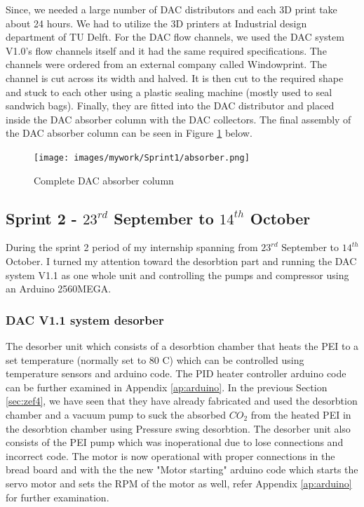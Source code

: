 Since, we needed a large number of DAC distributors and each 3D print take about 24 hours. We had to utilize the 3D printers at Industrial design department of TU Delft. For the DAC flow channels, we used the DAC system V1.0's flow channels itself and it had the same required specifications. The channels were ordered from an external company called Windowprint. The channel is cut across its width and halved. It is then cut to the required shape and stuck to each other using a plastic sealing machine (mostly used to seal sandwich bags). Finally, they are fitted into the DAC distributor and placed inside the DAC absorber column with the DAC collectors. The final assembly of the DAC absorber column can be seen in Figure \ref{fig:absorber} below.  

\begin{figure}[H]
    \centering
    \texttt{[image: images/mywork/Sprint1/absorber.png]}
    \caption{Complete DAC absorber column}
    \label{fig:absorber}
\end{figure}

\subsection{Sprint 2 - $23^{rd}$ September to $14^{th}$ October}
\label{sec:sprint2}

During the sprint 2 period of my internship spanning from $23^{rd}$ September to $14^{th}$ October. I turned my attention toward the desorbtion part and running the DAC system V1.1 as one whole unit and controlling the pumps and compressor using an Arduino 2560MEGA.  

\subsubsection{DAC V1.1 system desorber}
\label{sec:faultycomp}

The desorber unit which consists of a desorbtion chamber that heats the PEI to a set temperature (normally set to 80 \degree C) which can be controlled using temperature sensors and arduino code. The PID heater controller arduino code can be further examined in Appendix \ref{ap:arduino}. In the previous Section \ref{sec:zef4}, we have seen that they have already fabricated and used the desorbtion chamber and a vacuum pump to suck the absorbed $CO_2$ from the heated PEI in the desorbtion chamber using Pressure swing desorbtion. The desorber unit also consists of the PEI pump which was inoperational due to lose connections and incorrect code. The motor is now operational with proper connections in the bread board and with the the new "Motor starting" arduino code which starts the servo motor and sets the RPM of the motor as well, refer Appendix \ref{ap:arduino} for further examination. %

